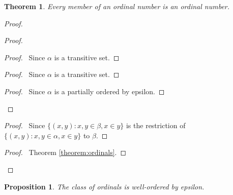 \documentclass{article}
\let\qed\relax
\newtheorem{proposition}[axiom]{Proposition}
\newtheorem{theorem}[axiom]{Theorem}
\theoremstyle{definition}
\begin{document}
    \begin{theorem}
        Every member of an ordinal number is an ordinal number.
    \end{theorem}

    \begin{proof}
        \pf
        \begin{proof}
            \begin{proof}
                \pf\ Since $\alpha$ is a transitive set.
            \end{proof}
            \begin{proof}
                \pf\ Since $\alpha$ is a transitive set.
            \end{proof}
            \begin{proof}
                \pf\ Since $\alpha$ is a partially ordered by epsilon.
            \end{proof}
        \end{proof}
        \begin{proof}
            \pf\ Since $\{ (x,y) : x,y \in \beta, x \in y \}$ is the restriction of
            $\{ (x,y) : x,y \in \alpha, x \in y \}$ to $\beta$.
        \end{proof}
        \begin{proof}
            \pf\ Theorem \ref{theorem:ordinals}.
        \end{proof}
        \qed
    \end{proof}

    \begin{proposition}
        The class of ordinals is well-ordered by epsilon.
    \end{proposition}
\end{document}
